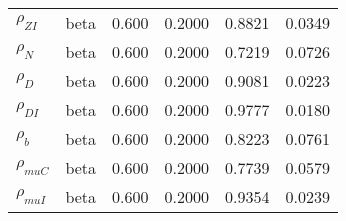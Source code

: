 \begin{center}
\begin{longtable}{llcccc}
${\rho_{ZI}}$ & beta &   0.600 & 0.2000 &   0.8821 &  0.0349 \\ 
${\rho_N}$ & beta &   0.600 & 0.2000 &   0.7219 &  0.0726 \\ 
${\rho_D}$ & beta &   0.600 & 0.2000 &   0.9081 &  0.0223 \\ 
${\rho_{DI}}$ & beta &   0.600 & 0.2000 &   0.9777 &  0.0180 \\ 
${\rho_b}$ & beta &   0.600 & 0.2000 &   0.8223 &  0.0761 \\ 
${\rho_{muC}}$ & beta &   0.600 & 0.2000 &   0.7739 &  0.0579 \\ 
${\rho_{muI}}$ & beta &   0.600 & 0.2000 &   0.9354 &  0.0239 \\ 
\end{longtable}
 \end{center}
